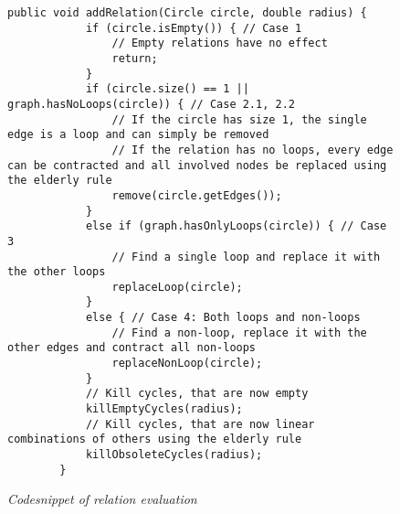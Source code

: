 \lstset{language=Java}
\begin{figure}
    \begin{lstlisting}[frame=single]
        public void addRelation(Circle circle, double radius) {
            if (circle.isEmpty()) { // Case 1
                // Empty relations have no effect
                return;
            }
            if (circle.size() == 1 || graph.hasNoLoops(circle)) { // Case 2.1, 2.2
                // If the circle has size 1, the single edge is a loop and can simply be removed
                // If the relation has no loops, every edge can be contracted and all involved nodes be replaced using the elderly rule
                remove(circle.getEdges());
            }
            else if (graph.hasOnlyLoops(circle)) { // Case 3
                // Find a single loop and replace it with the other loops
                replaceLoop(circle);
            }
            else { // Case 4: Both loops and non-loops
                // Find a non-loop, replace it with the other edges and contract all non-loops
                replaceNonLoop(circle);
            }
            // Kill cycles, that are now empty
            killEmptyCycles(radius);
            // Kill cycles, that are now linear combinations of others using the elderly rule
            killObsoleteCycles(radius);
        }
    \end{lstlisting}
    \caption{\textit{Codesnippet of relation evaluation}}
    \label{fig6}
\end{figure}